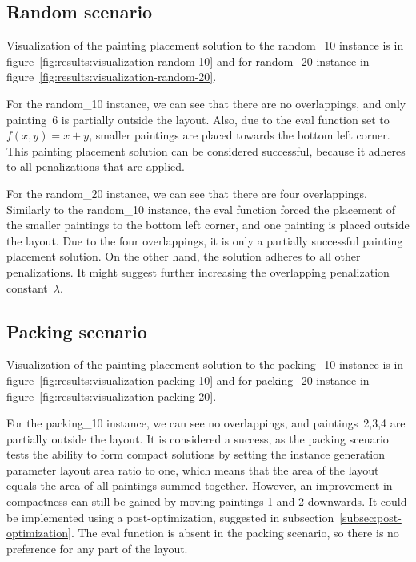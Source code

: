 \newpage

\subsection{Random scenario}\label{subsec:random-scenario}

Visualization of the painting placement solution to the random\_10 instance
is in figure~\ref{fig:results:visualization-random-10}
and for random\_20 instance in figure~\ref{fig:results:visualization-random-20}.

For the random\_10 instance, we can see that there are no overlappings, and only painting~6 is partially outside the layout.
Also, due to the eval function set to $f(x,y) = x+y$, smaller paintings
are placed towards the bottom left corner.
This painting placement solution can be considered successful,
because it adheres to all penalizations that are applied.

For the random\_20 instance, we can see that there are four overlappings.
Similarly to the random\_10 instance, the eval function forced the placement of the
smaller paintings to the bottom left corner, and one painting is placed outside the layout.
Due to the four overlappings, it is only a partially successful painting placement solution.
On the other hand, the solution adheres to all other penalizations.
It might suggest further increasing the overlapping penalization constant~$\lambda$.

\subsection{Packing scenario}\label{subsec:packing-scenario}
Visualization of the painting placement solution to the packing\_10 instance
is in figure~\ref{fig:results:visualization-packing-10}
and for packing\_20 instance in figure~\ref{fig:results:visualization-packing-20}.

For the packing\_10 instance, we can see no overlappings, and paintings~2,3,4 are partially outside the layout.
It is considered a success, as the packing scenario tests the ability to form compact solutions by setting the instance generation parameter
layout area ratio to one, which means that the area of the layout equals the area of all paintings summed together.
However, an improvement in compactness can still be gained by moving paintings 1 and 2 downwards.
It could be implemented using a post-optimization, suggested in subsection~\ref{subsec:post-optimization}.
The eval function is absent in the packing scenario, so there is no preference for any part of the layout.

